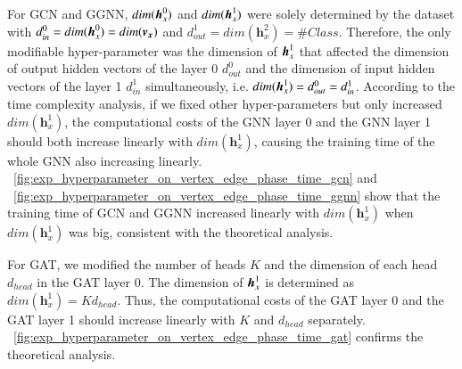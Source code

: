 

For GCN and GGNN, $dim(\boldsymbol{h}^0_x)$ and $dim(\boldsymbol{h}^1_x)$ were solely determined by the dataset with $d^0_{in} = dim(\boldsymbol{h}^0_x) = dim(\boldsymbol{v_x})$ and $d^1_{out} = dim(\boldsymbol{h}^2_x)=\#Class$.
%
Therefore, the only modifiable hyper-parameter was the dimension of $\boldsymbol{h}^1_x$ that affected the dimension of output hidden vectors of the layer 0 $d^0_{out}$ and the dimension of input hidden vectors of the layer 1 $d^1_{in}$ simultaneously, i.e. $dim(\boldsymbol{h}^1_x)  = d^0_{out} = d^1_{in}$.
%
According to the time complexity analysis, if we fixed other hyper-parameters but only increased $dim(\boldsymbol{h}^1_x)$, the computational costs of the GNN layer 0 and the GNN layer 1 should both increase linearly with $dim(\boldsymbol{h}^1_x)$, causing the training time of the whole GNN also increasing linearly. 
%
\figurename~\ref{fig:exp_hyperparameter_on_vertex_edge_phase_time_gcn} and \figurename~\ref{fig:exp_hyperparameter_on_vertex_edge_phase_time_ggnn} show that the training time of GCN and GGNN increased linearly with $dim(\boldsymbol{h}^1_x)$ when $dim(\boldsymbol{h}^1_x)$ was big, consistent with the theoretical analysis.

For GAT, we modified the number of heads $K$ and the dimension of each head $d_{head}$ in the GAT layer 0.
%
The dimension of $\boldsymbol{h}^1_x$ is determined as $dim(\boldsymbol{h}^1_x) = K d_{head}$.
%
Thus, the computational costs of the GAT layer 0 and the GAT layer 1 should increase linearly with $K$ and $d_{head}$ separately. 
%
\figurename~\ref{fig:exp_hyperparameter_on_vertex_edge_phase_time_gat} confirms the theoretical analysis.

